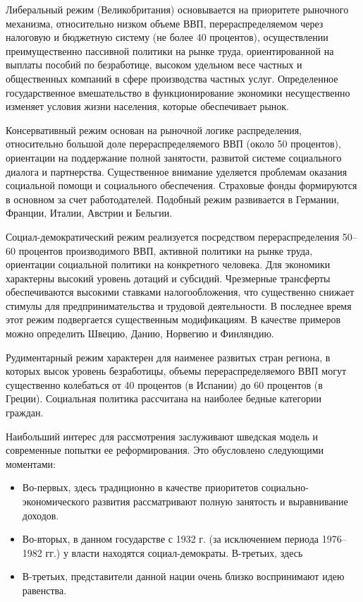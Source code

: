 \documentclass[14pt,a4paper]{article}
\begin{document}
    Либеральный режим (Великобритания) основывается на приоритете рыночного механизма, относительно низком объеме ВВП, перераспределяемом через налоговую и бюджетную систему (не более 40 процентов), осуществлении преимущественно пассивной политики на рынке труда, ориентированной на выплаты пособий по безработице, высоком удельном весе частных и общественных компаний в сфере производства частных услуг. Определенное государственное вмешательство в функционирование экономики несущественно изменяет условия жизни населения, которые обеспечивает рынок.
    \par
    Консервативный режим основан на рыночной логике распределения, относительно большой доле перераспределяемого ВВП (около 50 процентов), ориентации на поддержание полной занятости, развитой системе социального диалога и партнерства. Существенное внимание уделяется проблемам оказания социальной помощи и социального обеспечения. Страховые фонды формируются в основном за счет работодателей. Подобный режим развивается в Германии, Франции, Италии, Австрии и Бельгии.
    \par
    Социал-демократический режим реализуется посредством перераспределения 50–60 процентов производимого ВВП, активной политики на рынке труда, ориентации социальной политики на конкретного человека. Для экономики характерны высокий уровень дотаций и субсидий. Чрезмерные трансферты обеспечиваются высокими ставками налогообложения, что существенно снижает стимулы для предпринимательства и трудовой деятельности. В последнее время этот режим подвергается существенным модификациям. В качестве примеров можно определить Швецию, Данию, Норвегию и Финляндию.
    \par
    Рудиментарный режим характерен для наименее развитых стран региона, в которых высок уровень безработицы, объемы перераспределяемого ВВП могут существенно колебаться от 40 процентов (в Испании) до 60 процентов (в Греции). Социальная политика рассчитана на наиболее бедные категории граждан.
    \par
    Наибольший интерес для рассмотрения заслуживают шведская модель и современные попытки ее реформирования. Это обусловлено следующими моментами:
    \begin{itemize}
        \item Во-первых, здесь традиционно в качестве приоритетов социально-экономического развития рассматривают полную занятость и выравнивание доходов.
        \item Во-вторых, в данном государстве с 1932 г. (за исключением периода 1976–1982 гг.) у власти находятся социал-демократы. В-третьих, здесь
        \item В-третьих, представители данной нации очень близко воспринимают идею равенства.
    \end{itemize}
\end{document}
